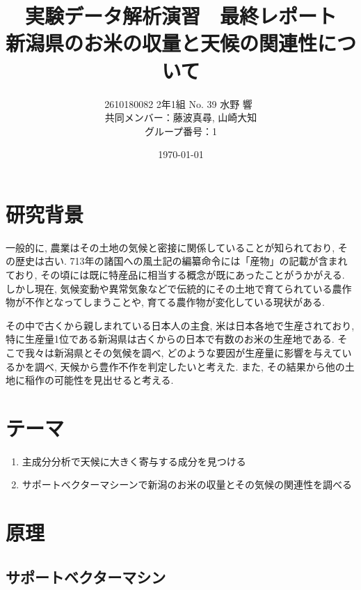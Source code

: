 \documentclass{jarticle}
\title{実験データ解析演習　最終レポート\\ 新潟県のお米の収量と天候の関連性について}
\author{2610180082 2年1組 No. 39  水野 響\ \\ 共同メンバー：藤波真尋, 山崎大知\\グループ番号：1}
\date{\today}
\begin{document}
\maketitle
\tableofcontents%
\newpage


\section{研究背景}
一般的に, 農業はその土地の気候と密接に関係していることが知られており, その歴史は古い. 713年の諸国への風土記の編纂命令には「産物」の記載が含まれており, その頃には既に特産品に相当する概念が既にあったことがうかがえる. しかし現在, 気候変動や異常気象などで伝統的にその土地で育てられている農作物が不作となってしまうことや, 育てる農作物が変化している現状がある.

その中で古くから親しまれている日本人の主食, 米は日本各地で生産されており, 特に生産量1位である新潟県は古くからの日本で有数のお米の生産地である. そこで我々は新潟県とその気候を調べ, どのような要因が生産量に影響を与えているかを調べ, 天候から豊作不作を判定したいと考えた. また, その結果から他の土地に稲作の可能性を見出せると考える.

\hypertarget{header-n2003}{%
\section{テーマ}\label{header-n2003}}

\begin{enumerate}
\item 主成分分析で天候に大きく寄与する成分を見つける
\item サポートベクターマシーンで新潟のお米の収量とその気候の関連性を調べる
\end{enumerate}


\hypertarget{header-n2005}{%
\section{原理}\label{header-n2005}}



\hypertarget{header-n2009}{%
\subsection{サポートベクターマシン}\label{header-n2009}}
\end{document}

